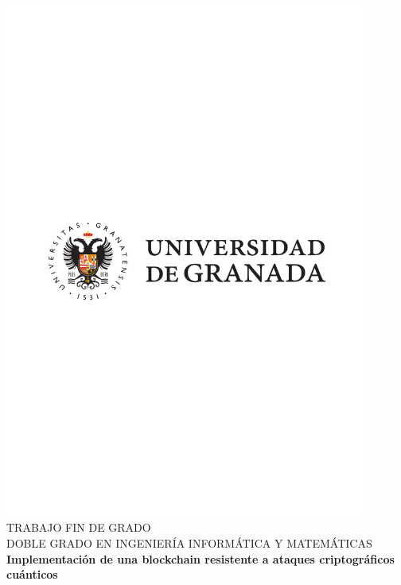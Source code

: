 \begin{titlepage}
 
 
\newlength{\centeroffset}
\setlength{\centeroffset}{-0.5\oddsidemargin}
\addtolength{\centeroffset}{0.5\evensidemargin}
\thispagestyle{empty}

\noindent\hspace*{\centeroffset}\begin{minipage}{\textwidth}

\centering
\includegraphics[width=0.9\textwidth]{portada/imagenes/logoModernoUGR.pdf}\\[1cm]

\textsc{ \Large TRABAJO FIN DE GRADO\\[0.2cm]}
\textsc{ DOBLE GRADO EN INGENIERÍA INFORMÁTICA Y MATEMÁTICAS }\\[1cm]
% 
{\Huge\bfseries Implementación de una blockchain resistente a ataques criptográficos cuánticos\\
}
\end{minipage}


\end{titlepage}
